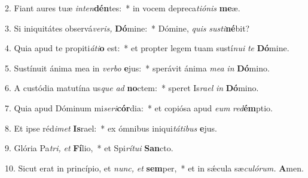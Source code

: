 \item 2. Fiant aures tuæ \textit{inten}\textbf{dén}tes:~* in vocem depreca\textit{tiónis} \textbf{me}æ.
\item 3. Si iniquitátes observá\textit{veris,} \textbf{Dó}mine:~* Dómine, \textit{quis} \textit{susti}\textbf{né}bit?
\item 4. Quia apud te propiti\textit{áti}\textbf{o} est:~* et propter legem tuam sustí\textit{nui} \textit{te} \textbf{Dó}mine.
\item 5. Sustínuit ánima mea in \textit{verbo} \textbf{e}jus:~* sperávit ánima \textit{mea} \textit{in} \textbf{Dó}mino.
\item 6. A custódia matutína us\textit{que} \textit{ad} \textbf{no}ctem:~* speret Is\textit{rael} \textit{in} \textbf{Dó}mino.
\item 7. Quia apud Dóminum mi\hspace{0.03em}\textit{seri}\textbf{cór}dia:~* et copiósa apud \textit{eum} \textit{red}\textbf{ém}ptio.
\item 8. Et ipse réd\textit{imet} \textbf{Is}rael:~* ex ómnibus iniqui\textit{tátibus} \textbf{e}jus.
\item 9. Glória Pa\hspace{0.03em}\textit{tri,} \textit{et} \textbf{Fí}lio,~* et Spi\textit{rítui} \textbf{San}cto.
\item 10. Sicut erat in princípio, et \textit{nunc,} \textit{et} \textbf{sem}per,~* et in sǽcula sæ\textit{culórum.} \textbf{A}men.
